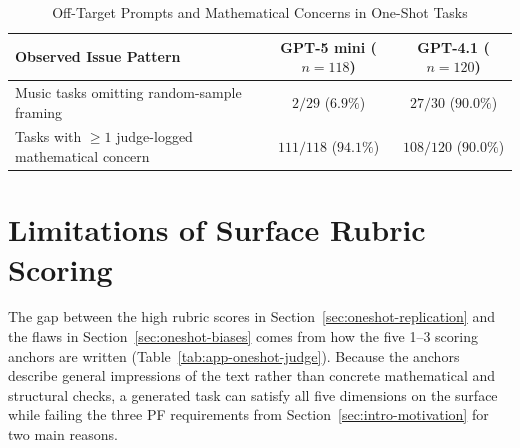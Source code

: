 \begin{table}[!htb]
\centering
\caption[Off-Target Prompts and Mathematical Concerns in One-Shot Tasks]{Off-Target Prompts and Mathematical Concerns in One-Shot Tasks}
\label{tab:oneshot-offtarget-math-counts}
\label{tab:oneshot-failure-counts}
\footnotesize
\setlength{\tabcolsep}{10pt}
\renewcommand{\arraystretch}{1.35}
\begin{tabular}{@{} >{\raggedright\arraybackslash}p{} c c @{}}
\toprule
\textbf{Observed Issue Pattern} & \textbf{GPT-5 mini ($n = 118$)} & \textbf{GPT-4.1 ($n = 120$)} \\
\midrule
Music tasks omitting random-sample framing & $2 / 29$ ($6.9\%$) & $27 / 30$ ($90.0\%$) \\
\addlinespace[3pt]
Tasks with $\ge 1$ judge-logged mathematical concern & $111 / 118$ ($94.1\%$) & $108 / 120$ ($90.0\%$) \\
\bottomrule
\end{tabular}
\end{table}

\section{Limitations of Surface Rubric Scoring}
\label{sec:oneshot-surface-rubric}

The gap between the high rubric scores in Section~\ref{sec:oneshot-replication} and the flaws in Section~\ref{sec:oneshot-biases} comes from how the five 1--3 scoring anchors are written (Table~\ref{tab:app-oneshot-judge}). Because the anchors describe general impressions of the text rather than concrete mathematical and structural checks, a generated task can satisfy all five dimensions on the surface while failing the three PF requirements from Section~\ref{sec:intro-motivation} for two main reasons.

